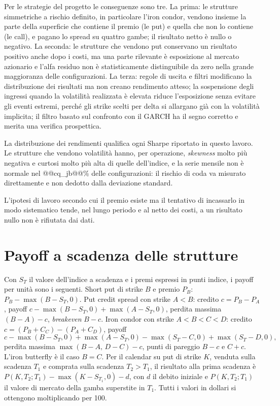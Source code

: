 \documentclass[11pt,a4paper]{article}
\begin{document}
Per le strategie del progetto le conseguenze sono tre. La prima: le strutture simmetriche a rischio definito, in particolare l'iron condor, vendono insieme la parte della superficie che contiene il premio (le put) e quella che non lo contiene (le call), e pagano lo spread su quattro gambe; il risultato netto è nullo o negativo. La seconda: le strutture che vendono put conservano un risultato positivo anche dopo i costi, ma una parte rilevante è esposizione al mercato azionario e l'alfa residuo non è statisticamente distinguibile da zero nella grande maggioranza delle configurazioni. La terza: regole di uscita e filtri modificano la distribuzione dei risultati ma non creano rendimento atteso; la sospensione degli ingressi quando la volatilità realizzata è elevata riduce l'esposizione senza evitare gli eventi estremi, perché gli strike scelti per delta si allargano già con la volatilità implicita; il filtro basato sul confronto con il GARCH ha il segno corretto e merita una verifica prospettica.

La distribuzione dei rendimenti qualifica ogni Sharpe riportato in questo lavoro. Le strutture che vendono volatilità hanno, per operazione, \emph{skewness} molto più negativa e curtosi molto più alta di quelle dell'indice, e la serie mensile non è normale nel @@cq_jb@@\% delle configurazioni: il rischio di coda va misurato direttamente e non dedotto dalla deviazione standard.

L'ipotesi di lavoro secondo cui il premio esiste ma il tentativo di incassarlo in modo sistematico tende, nel lungo periodo e al netto dei costi, a un risultato nullo non è rifiutata dai dati.

\appendix
\section{Payoff a scadenza delle strutture}\label{app:payoff}

Con $S_T$ il valore dell'indice a scadenza e i premi espressi in punti indice, i payoff per unità sono i seguenti. Short put di strike $B$ e premio $P_B$: $P_B - \max(B-S_T,0)$. Put credit spread con strike $A<B$: credito $c=P_B-P_A$, payoff $c - \max(B-S_T,0) + \max(A-S_T,0)$, perdita massima $(B-A)-c$, \emph{breakeven} $B-c$. Iron condor con strike $A<B<C<D$: credito $c=(P_B+C_C)-(P_A+C_D)$, payoff
\[
c - \max(B-S_T,0) + \max(A-S_T,0) - \max(S_T-C,0) + \max(S_T-D,0),
\]
perdita massima $\max(B-A,\,D-C)-c$, punti di pareggio $B-c$ e $C+c$. L'iron butterfly è il caso $B=C$. Per il calendar su put di strike $K$, venduta sulla scadenza $T_1$ e comprata sulla scadenza $T_2>T_1$, il risultato alla prima scadenza è $P(K,T_2;T_1) - \max(K-S_{T_1},0) - d$, con $d$ il debito iniziale e $P(K,T_2;T_1)$ il valore di mercato della gamba superstite in $T_1$. Tutti i valori in dollari si ottengono moltiplicando per 100.
\end{document}
